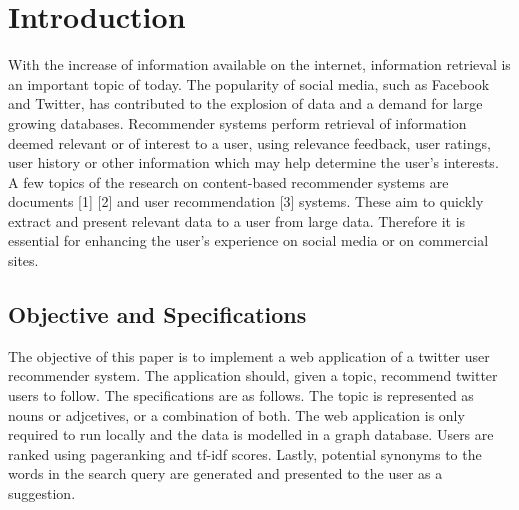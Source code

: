 \section{Introduction}
\label{sec:intro}

With the increase of information available on the internet, information retrieval is an important topic of today. The popularity of social media, such as Facebook and Twitter, has contributed to the explosion of data and a demand for large growing databases. Recommender systems perform retrieval of information deemed relevant or of interest to a user, using relevance feedback, user ratings, user history or other information which may help determine the user’s interests. A few topics of the research on content-based recommender systems are documents [1] [2] and user recommendation [3] systems. These aim to quickly extract and present relevant data to a user from large data. Therefore it is essential for enhancing the user’s experience on social media or on commercial sites.  

\subsection{Objective and Specifications}
The objective of this paper is to implement a web application of a twitter user recommender system. The application should, given a topic, recommend twitter users to follow. The specifications are as follows. The topic is represented as nouns or adjcetives, or a combination of both. The web application is only required to run locally and the data is modelled in a graph database. Users are ranked using pageranking and tf-idf scores. Lastly, potential synonyms to the words in the search query are generated and presented to the user as a suggestion.


